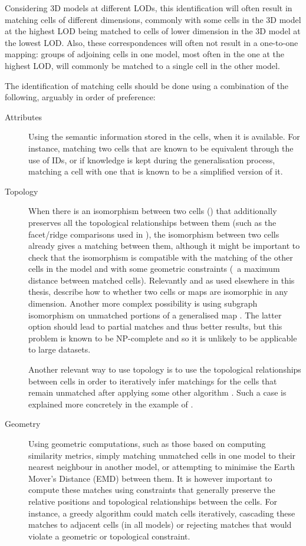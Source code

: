 Considering 3D models at different LODs, this identification will often result in matching cells of different dimensions, commonly with some cells in the 3D model at the highest LOD being matched to cells of lower dimension in the 3D model at the lowest LOD\@.
Also, these correspondences will often not result in a one-to-one mapping: groups of adjoining cells in one model, most often in the one at the highest LOD, will commonly be matched to a single cell in the other model.

The identification of matching cells should be done using a combination of the following, arguably in order of preference:

\begin{description}
\item[Attributes]
Using the semantic information stored in the cells, when it is available.
For instance, matching two cells that are known to be equivalent through the use of IDs, or if knowledge is kept during the generalisation process, matching a cell with one that is known to be a simplified version of it.

\item[Topology]
When there is an isomorphism between two cells () that additionally preserves all the topological relationships between them (such as the facet/ridge comparisons used in ), the isomorphism between two cells already gives a matching between them, although it might be important to check that the isomorphism is compatible with the matching of the other cells in the model and with some geometric constraints (\eg\ a maximum distance between matched cells).
Relevantly and as used elsewhere in this thesis, \citet{Gosselin11} describe how to whether two cells or maps are isomorphic in any dimension.
Another more complex possibility is using subgraph isomorphism on unmatched portions of a generalised map \citep{Eppstein99}.
The latter option should lead to partial matches and thus better results, but this problem is known to be NP-complete and so it is unlikely to be applicable to large datasets.

Another relevant way to use topology is to use the topological relationships between cells in order to iteratively infer matchings for the cells that remain unmatched after applying some other algorithm \citep{Hampe03}.
Such a case is explained more concretely in the example of .

\item[Geometry]
Using geometric computations, such as those based on computing similarity metrics, simply matching unmatched cells in one model to their nearest neighbour in another model, or attempting to minimise the Earth Mover's Distance (EMD) \citep{Rubner98} between them.
It is however important to compute these matches using constraints that generally preserve the relative positions and topological relationships between the cells.
For instance, a greedy algorithm could match cells iteratively, cascading these matches to adjacent cells (in all models) or rejecting matches that would violate a geometric or topological constraint.
\end{description}

